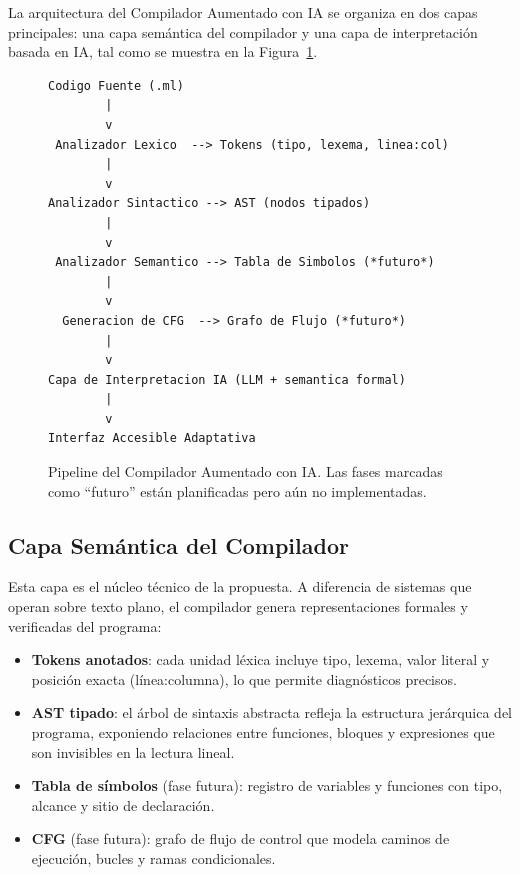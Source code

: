 \documentclass[conference]{IEEEtran}
\begin{document}
La arquitectura del Compilador Aumentado con IA se organiza en dos capas principales: una capa semántica del compilador y una capa de interpretación basada en IA, tal como se muestra en la Figura~\ref{fig:arquitectura}.

\begin{figure}[h]
\centering
\begin{lstlisting}[language={},frame=single,numbers=none,basicstyle=\ttfamily\scriptsize]
Codigo Fuente (.ml)
        |
        v
 Analizador Lexico  --> Tokens (tipo, lexema, linea:col)
        |
        v
Analizador Sintactico --> AST (nodos tipados)
        |
        v
 Analizador Semantico --> Tabla de Simbolos (*futuro*)
        |
        v
  Generacion de CFG  --> Grafo de Flujo (*futuro*)
        |
        v
Capa de Interpretacion IA (LLM + semantica formal)
        |
        v
Interfaz Accesible Adaptativa
\end{lstlisting}
\caption{Pipeline del Compilador Aumentado con IA. Las fases marcadas como ``futuro'' están planificadas pero aún no implementadas.}
\label{fig:arquitectura}
\end{figure}

\subsection{Capa Semántica del Compilador}

Esta capa es el núcleo técnico de la propuesta. A diferencia de sistemas que operan sobre texto plano, el compilador genera representaciones formales y verificadas del programa:

\begin{itemize}
    \item \textbf{Tokens anotados}: cada unidad léxica incluye tipo, lexema, valor literal y posición exacta (línea:columna), lo que permite diagnósticos precisos.
    \item \textbf{AST tipado}: el árbol de sintaxis abstracta refleja la estructura jerárquica del programa, exponiendo relaciones entre funciones, bloques y expresiones que son invisibles en la lectura lineal.
    \item \textbf{Tabla de símbolos} (fase futura): registro de variables y funciones con tipo, alcance y sitio de declaración.
    \item \textbf{CFG} (fase futura): grafo de flujo de control que modela caminos de ejecución, bucles y ramas condicionales.
\end{itemize}
\end{document}
